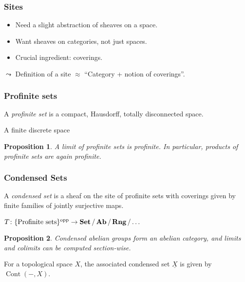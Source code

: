 \documentclass{beamer}
\newtheorem{proposition}{Proposition}
\DeclareMathOperator{\opp}{opp}
\DeclareMathOperator{\Cont}{Cont}
\begin{document}
\begin{frame}
    \frametitle{Sites}

    \begin{itemize}
        \item Need a slight abstraction of sheaves on a space.
        \item Want sheaves on categories, not just spaces.
        \item Crucial ingredient: coverings.
    \end{itemize}
    \medskip

    \pause
    $\leadsto$ Definition of a site $\approx $ ``Category + notion of coverings''.

\end{frame}

\begin{frame}
    \frametitle{Profinite sets}


    \begin{definition}
        A \emph{profinite set} is a compact, Hausdorff, totally disconnected space.
    \end{definition}
    \begin{example}
        A finite discrete space
    \end{example}
    \pause

    \begin{proposition}
        A limit of profinite sets is profinite.
        In particular, products of profinite sets
        are again profinite.
    \end{proposition}

\end{frame}

\begin{frame}
    \frametitle{Condensed Sets}

    \begin{definition}
        A \emph{condensed set} is a sheaf on the site of profinite sets
        with coverings given by finite families of jointly surjective maps.
    \end{definition}
    \begin{center}
        $T \colon \{\text{Profinite sets}\}^{\opp} \to \Set / \Ab / \Rng / \dots$
    \end{center}
    \pause[3]
    \begin{proposition}
        Condensed abelian groups form an abelian category, and
        limits and colimits can be computed section-wise.
    \end{proposition}

    \pause

    For a topological space $X$, the associated condensed set $\underline{X}$
    is given by $\Cont(-,X)$.
\end{frame}
\end{document}
